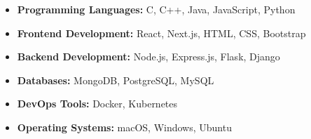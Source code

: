 
\begin{itemize}
  \item \textbf{Programming Languages:} C, C++, Java, JavaScript, Python
  \item \textbf{Frontend Development:} React, Next.js, HTML, CSS, Bootstrap
  \item \textbf{Backend Development:} Node.js, Express.js, Flask, Django
  \item \textbf{Databases:} MongoDB, PostgreSQL, MySQL
  \item \textbf{DevOps Tools:} Docker, Kubernetes
  \item \textbf{Operating Systems:} macOS, Windows, Ubuntu
\end{itemize}
